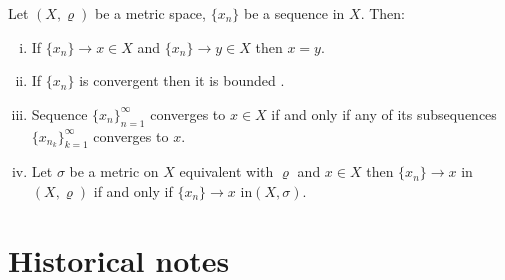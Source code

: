 \begin{theorem} \label{th:mpseq}
Let $(X,\varrho)$ be a metric space, $\{x_n\}$ be a sequence in $X$. Then:
\begin{enumerate}[(i)]
	\item If $\{x_n\}\to x\in X$ and $\{x_n\}\to y\in X$ then $x=y$.
	\item If $\{x_n\}$ is convergent then it is bounded \tbd.
	\item Sequence $\{x_n\}_{n=1}^\infty$ converges to $x\in X$ if and only if any of its subsequences $\{x_{n_k}\}_{k=1}^\infty$ converges to $x$.
	\item Let $\sigma$ be a metric on $X$ equivalent with $\varrho$ and $x\in X$ then $\{x_n\}\to x$ in $(X,\varrho)$ if and only if $\{x_n\}\to x$ in$(X,\sigma)$.
\end{enumerate}
\end{theorem} 


\section{Historical notes}

